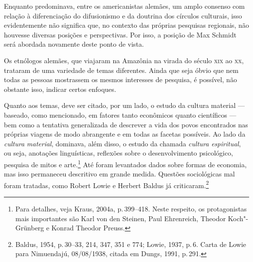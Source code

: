 Enquanto predominava, entre os americanistas alemães, um amplo consenso
com relação à diferenciação do difusionismo e da doutrina dos círculos
culturais, isso evidentemente não significa que, no contexto das
próprias pesquisas regionais, não houvesse diversas posições e
perspectivas. Por isso, a posição de Max Schmidt será abordada
novamente deste ponto de vista.

Os etnólogos alemães, que viajaram na Amazônia na virada do século \textsc{xix}
ao \textsc{xx}, trataram de uma variedade de temas diferentes. Ainda que seja
óbvio que nem todas as pessoas mostrassem os mesmos interesses de
pesquisa, é possível, não obstante isso, indicar certos enfoques.

Quanto aos temas, deve ser citado, por um lado, o estudo da cultura
material --- baseado, como mencionado, em fatores tanto econômicos quanto
científicos --- bem como a tentativa generalizada de descrever a vida dos
povos encontrados nas próprias viagens de modo abrangente e em todas as
facetas possíveis. Ao lado da \textit{cultura material}, dominava, além
disso, o estudo da chamada \textit{cultura espiritual}, ou seja, anotações linguísticas, reflexões sobre o
desenvolvimento psicológico, pesquisa de mitos e arte.\footnote{Para
  detalhes, veja Kraus, 2004a, p.\,399--418. Neste respeito, os
  protagonistas mais importantes são Karl von den Steinen, Paul
  Ehrenreich, Theodor Koch"-Grünberg e Konrad Theodor Preuss.} Até foram
levantados dados sobre formas de economia, mas isso permaneceu
descritivo em grande medida. Questões sociológicas mal foram tratadas,
como Robert Lowie e Herbert Baldus já criticaram.\footnote{Baldus, 1954,
  p.\,30--33, 214, 347, 351 e 774; Lowie, 1937, p.\,6. Carta de Lowie para
  Nimuendajú, 08/08/1938, citada em Dungs, 1991, p.\,291.}

